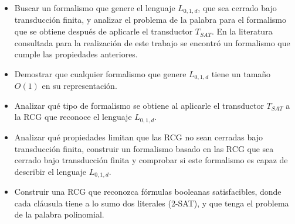 \documentclass[12pt]{article}
\begin{document}
\begin{itemize}
      \item Buscar un formalismo que genere el lenguaje $L_{0,1,d}$, que sea cerrado bajo transducción finita, y analizar el problema de la palabra para el formalismo que se obtiene después de aplicarle el transductor $T_{SAT}$. En la literatura
            consultada \cite{globalIndexLanguages} para la realización de este trabajo se encontró un formalismo que cumple las propiedades anteriores.
      \item Demostrar que cualquier formalismo que genere $L_{0,1,d}$ tiene un tamaño $O(1)$ en su representación.
      \item Analizar qué tipo de formalismo se obtiene al aplicarle el transductor $T_{SAT}$ a la RCG que reconoce el lenguaje $L_{0,1,d}$.
      \item Analizar qué propiedades limitan que las RCG no sean cerradas bajo transducción finita, construir un formalismo basado en las RCG que sea cerrado bajo transducción finita y comprobar si este formalismo es capaz de describir el lenguaje $L_{0,1,d}$.
      \item Construir una RCG que reconozca fórmulas booleanas satisfacibles, donde cada cláusula tiene a lo sumo dos literales (2-SAT), y que tenga el problema de la palabra polinomial.
\end{itemize}
\end{document}
